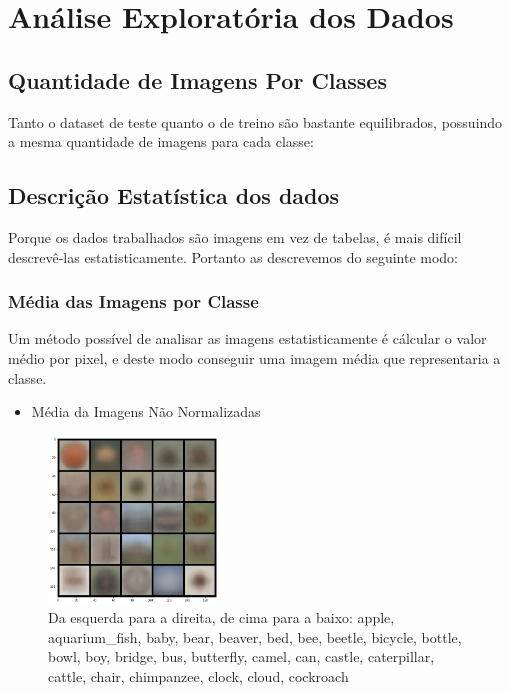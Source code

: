 \documentclass[conference]{IEEEtran}
\begin{document}
\section{Análise Exploratória dos Dados}

\subsection{Quantidade de Imagens Por Classes}

Tanto o dataset de teste quanto o de treino são bastante equilibrados,
possuindo a mesma quantidade de imagens para cada classe:


\subsection{Descrição Estatística dos dados}

Porque os dados trabalhados são imagens em vez de tabelas,
é mais difícil descrevê-las estatisticamente.
Portanto as descrevemos do seguinte modo:

\subsubsection{Média das Imagens por Classe}

Um método possível de analisar as imagens estatisticamente
é cálcular o valor médio por pixel, e deste modo conseguir uma imagem média que
representaria a classe.

\begin{itemize}
\item Média da Imagens Não Normalizadas
\end{itemize}

\begin{figure}[H]
\centerline{\includegraphics[width=0.4\textwidth]{Images/img_mean1.png}}
\caption{\label{fig:img_mean1}Da esquerda para a direita, de cima para a baixo: apple, aquarium\_fish, baby, bear, beaver, bed, bee, beetle, bicycle, bottle, bowl, boy, bridge, bus, butterfly, camel, can, castle, caterpillar, cattle, chair, chimpanzee, clock, cloud, cockroach}
\end{figure}
\end{document}
